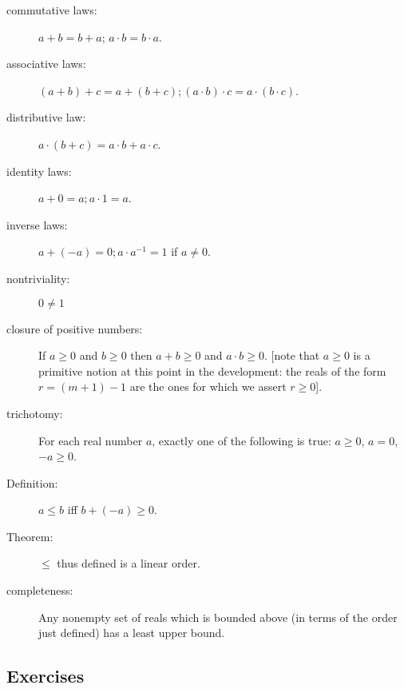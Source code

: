 \documentclass[12pt]{book}
\begin{document}
\begin{description}

\item[commutative laws:]  $a+b=b+a$; $a\cdot b = b \cdot a$.

\item[associative laws:] $(a+b)+c = a+(b+c); (a\cdot b)\cdot c = a\cdot (b\cdot c)$.

\item[distributive law:] $a\cdot (b+c) = a\cdot b + a\cdot c$.

\item[identity laws:] $a+0 = a; a\cdot 1 = a$.

\item[inverse laws:] $a+(-a)=0; a\cdot a^{-1} = 1$ if $a \neq 0$.

\item[nontriviality:] $0 \neq 1$

\item[closure of positive numbers:] If $a\geq 0$ and $b \geq 0$ then
$a+b \geq 0$ and $a \cdot b \geq 0$. [note that $a \geq 0$ is a
primitive notion at this point in the development: the reals of the
form $r=(m+1)-1$ are the ones for which we assert $r \geq 0$].

\item[trichotomy:] For each real number $a$, exactly one of the
following is true: $a \geq 0$, $a=0$, $-a \geq 0$.

\item[Definition:] $a\leq b$ iff $b+(-a) \geq 0$.

\item[Theorem:] $\leq$ thus defined is a linear order.

\item[completeness:] Any nonempty set of reals which is bounded above
(in terms of the order just defined) has a least upper bound.

\end{description}

\newpage

\subsection{Exercises}
\end{document}
